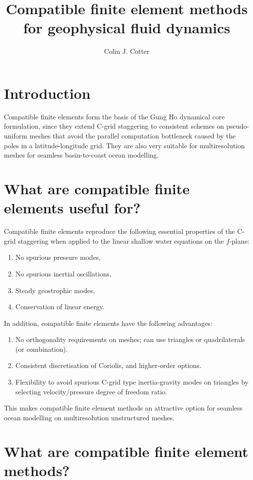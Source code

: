 \documentclass[landscape]{imposter}
\title{Compatible finite element methods for geophysical fluid dynamics}
\author{Colin J. Cotter}
\begin{document}
\begin{multicols*}{3}
\section{Introduction}
Compatible finite elements form the basis of the Gung Ho dynamical
core formulation, since they extend C-grid staggering to consistent
schemes on pseudo-uniform meshes that avoid the parallel computation
bottleneck caused by the poles in a latitude-longitude grid. They are
also very suitable for multiresolution meshes for seamless
basin-to-coast ocean modelling.

\section{What are compatible finite elements useful for?}

Compatible finite elements \cite{cotter2012mixed} reproduce the
following essential properties of the C-grid staggering when applied
to the linear shallow water equations on the $f$-plane:
\begin{multicols}{2}
\begin{enumerate}
\item No spurious pressure modes,
\item No spurious inertial oscillations,
\item Steady geostrophic modes,
\item Conservation of linear energy.
\end{enumerate}
\end{multicols}
In addition, compatible finite elements have the following advantages:
\begin{enumerate}
\item No orthogonality requirements on meshes; can use triangles or
  quadrilaterals (or combination).
\item Consistent discretisation of Coriolis, and higher-order options.
\item Flexibility to avoid spurious C-grid type inertia-gravity modes on triangles \cite{danilov2010utility}
  by selecting velocity/pressure degree of freedom ratio.
\end{enumerate}
This makes compatible finite element methods an attractive option for
seamless ocean modelling on multiresolution unstructured meshes.

\section{What are compatible finite element methods?}


\end{multicols*}
\end{document}

